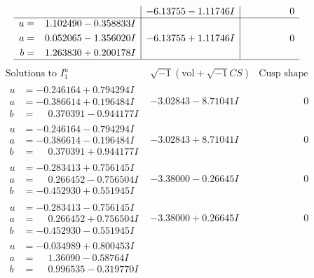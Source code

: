 \documentclass[1p]{elsarticle_modified}
\theoremstyle{definition}
\newcommand{\I}{\sqrt{-1}}
\begin{document}
$$\begin{array}{c|c|c}
 & -6.13755 - 1.11746 I & \phantom{-0.000000 } 0 \\ \hline\begin{aligned}
u &= \phantom{-}1.102490 - 0.358833 I \\
a &= \phantom{-}0.052065 - 1.356020 I \\
b &= \phantom{-}1.263830 + 0.200178 I\end{aligned}
 & -6.13755 + 1.11746 I & \phantom{-0.000000 } 0\\
 \hline 
 \end{array}$$\newpage$$\begin{array}{c|c|c}  
\text{Solutions to }I^u_{1}& \I (\text{vol} + \sqrt{-1}CS) & \text{Cusp shape}\\
 \hline 
\begin{aligned}
u &= -0.246164 + 0.794294 I \\
a &= -0.386614 + 0.196484 I \\
b &= \phantom{-}0.370391 - 0.944177 I\end{aligned}
 & -3.02843 - 8.71041 I & \phantom{-0.000000 } 0 \\ \hline\begin{aligned}
u &= -0.246164 - 0.794294 I \\
a &= -0.386614 - 0.196484 I \\
b &= \phantom{-}0.370391 + 0.944177 I\end{aligned}
 & -3.02843 + 8.71041 I & \phantom{-0.000000 } 0 \\ \hline\begin{aligned}
u &= -0.283413 + 0.756145 I \\
a &= \phantom{-}0.266452 - 0.756504 I \\
b &= -0.452930 + 0.551945 I\end{aligned}
 & -3.38000 - 0.26645 I & \phantom{-0.000000 } 0 \\ \hline\begin{aligned}
u &= -0.283413 - 0.756145 I \\
a &= \phantom{-}0.266452 + 0.756504 I \\
b &= -0.452930 - 0.551945 I\end{aligned}
 & -3.38000 + 0.26645 I & \phantom{-0.000000 } 0 \\ \hline\begin{aligned}
u &= -0.034989 + 0.800453 I \\
a &= \phantom{-}1.36090 - 0.58764 I \\
b &= \phantom{-}0.996535 - 0.319770 I\end{aligned}

\end{array}$$
\end{document}
